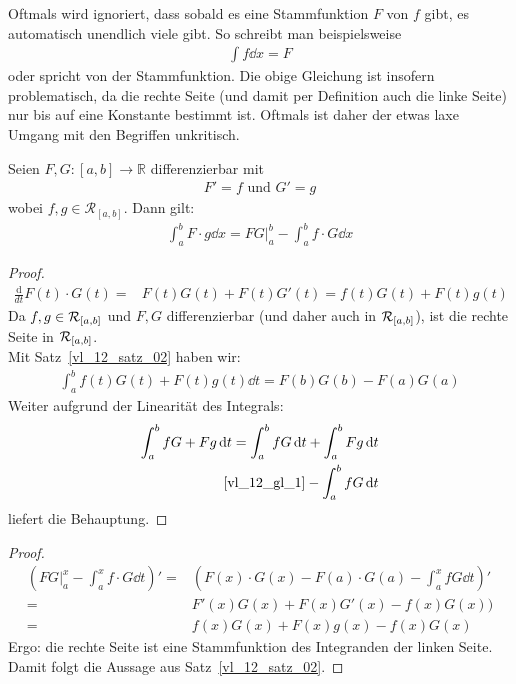 \begin{Bemerkung}{
	Oftmals wird ignoriert, dass sobald es eine Stammfunktion $F$ von $f$ gibt, es 
	automatisch unendlich viele gibt. So schreibt man beispielsweise 
	\begin{align*}
		\int f \dd{x} = F
	\end{align*} 
	oder spricht von \glqq der\grqq{} Stammfunktion. Die obige Gleichung ist
	 insofern problematisch, da die rechte Seite (und damit per Definition auch die 
	 linke Seite) nur bis auf eine Konstante bestimmt ist. Oftmals ist daher der 
	 etwas laxe Umgang mit den Begriffen unkritisch.
}\end{Bemerkung}

\begin{Satz}{\label{vl_12_satz_03}
	Seien $F,G: [a,b] \rightarrow \mathbb{R}$ differenzierbar mit 
	\begin{align*}
		F' = f \text{ und } G' = g 
	\end{align*}
	wobei $f,g \in \mathcal{R}_{[a,b]}$. Dann gilt:
	\begin{align*}
		\int_a^b F \cdot g \dd{x} = FG\vert_a^b - \int_a^b f \cdot G \dd{x}
	\end{align*}
}\end{Satz}

\begin{proof}
	\begin{align}\label{vl_12_gl_1}
		\frac{\mathrm{d}}{dt}F(t)\cdot G(t) = & F(t)G(t) + F(t)G'(t) = 
		f(t)G(t) + F(t)g(t)
	\end{align}
	Da $f,g \in \mathcal{R}_{[{a},{b}]}$ und $F,G$ differenzierbar (und daher auch in 
	$\mathcal{R}_{[{a},{b}]}$), ist die rechte Seite in $\mathcal{R}_{[{a},{b}]}$. \\
	Mit Satz~\ref{vl_12_satz_02} haben wir:
	\begin{align*}
		\int_a^b f(t) G(t) + F(t)g(t) \dd{t} = F(b)G(b) -F(a)G(a)
	\end{align*}
	Weiter aufgrund der Linearität des Integrals:
	\begin{align*}
		\int_a^bfG + Fg \dd{t} = \int_a^b fG\dd{t} + \int_a^b Fg\dd{t} \\
		\ref{vl_12_gl_1}-\int_a^b fG\dd{t}
	\end{align*}
	liefert die Behauptung.
\end{proof}

\begin{proof}
	\begin{align*}
		\left( FG|_a^x - \int_a^x f \cdot G \dd{t} \right)' = &
		\left(F(x) \cdot G(x) - F(a) \cdot G(a) - \int_a^x fG \dd{t} \right)' \\
		= & F'(x)G(x) + F(x)G'(x) - f(x)G(x)) \\
		= & f(x)G(x) + F(x)g(x) -f(x)G(x)
	\end{align*}
	Ergo: die rechte Seite ist eine Stammfunktion des Integranden der 
	linken Seite. Damit folgt die Aussage aus Satz~\ref{vl_12_satz_02}.
\end{proof}


